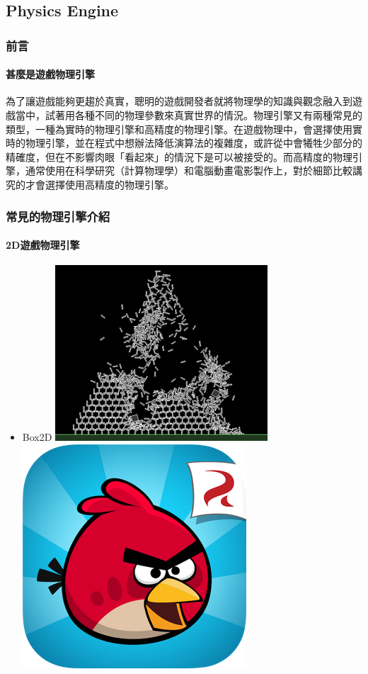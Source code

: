 \subsection{Physics Engine}
\label{sub:Physics Engine}

\subsubsection{前言}

\paragraph{甚麼是遊戲物理引擎}

為了讓遊戲能夠更趨於真實，聰明的遊戲開發者就將物理學的知識與觀念融入到遊戲當中，試著用各種不同的物理參數來真實世界的情況。物理引擎又有兩種常見的類型，一種為實時的物理引擎和高精度的物理引擎。在遊戲物理中，會選擇使用實時的物理引擎，並在程式中想辦法降低演算法的複雜度，或許從中會犧牲少部分的精確度，但在不影響肉眼「看起來」的情況下是可以被接受的。而高精度的物理引擎，通常使用在科學研究（計算物理學）和電腦動畫電影製作上，對於細節比較講究的才會選擇使用高精度的物理引擎。

\subsubsection{常見的物理引擎介紹}

\paragraph{2D遊戲物理引擎}
\begin{itemize}
    \item{Box2D}
        \includegraphics[width=0.3\linewidth]{./resources/physics/box2d(1).png} 
                \includegraphics[width=0.3\linewidth]{./resources/physics/angryBird.png}
\end{itemize}

